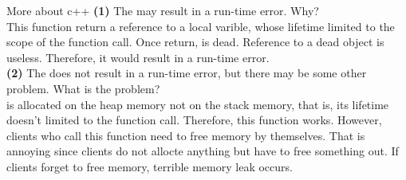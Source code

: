 




\maketitle

\pagebreak

\begin{homeworkProblem}{More about c++}
    \textbf{(1)} The  may result in a run-time error. Why?
    \\

    This function return a reference to a local varible, whose lifetime limited to
    the scope of the function call. Once  return,  is dead. 
    Reference to a dead object is useless. Therefore, it would result in a run-time
    error.
    \\

    \textbf{(2)} The  does not result in a run-time error,
    but there may be some other problem. What is the problem?
    \\

     is allocated on the heap memory not on the stack memory, that is,
    its lifetime doesn't limited to the function call. Therefore, this function works.
    However, clients who call this function need to free memory by themselves. That is
    annoying since clients do not allocte anything but have to free something out. If
    clients forget to free memory, terrible memory leak occurs.
    \\
    
\end{homeworkProblem}

